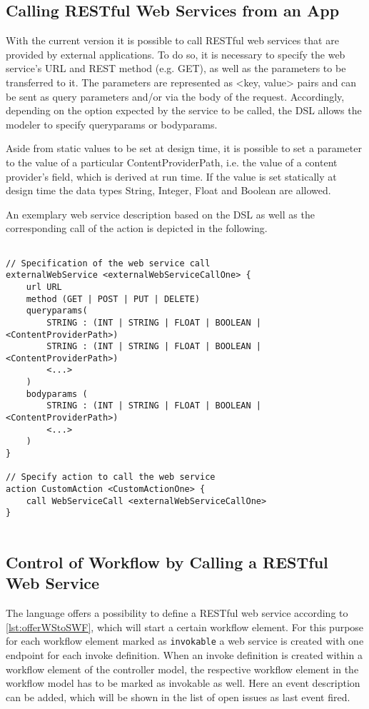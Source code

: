 
\subsection{Calling RESTful Web Services from an App}
\label{subsec: CallingWebServices}
With the current \MD version it is possible to call RESTful web services that are provided by external applications. To do so, it is necessary to specify the web service's URL and REST method (e.g. GET), as well as the parameters to be transferred to it. The parameters are represented as <key, value> pairs and can be sent as query parameters and/or via the body of the request. Accordingly, depending on the option expected by the service to be called, the DSL allows the modeler to specify queryparams or bodyparams. 

Aside from static values to be set at design time, it is possible to set a parameter to the value of a particular ContentProviderPath, i.e. the value of a content provider's field, which is derived at run time. If the value is set statically at design time the data types String, Integer, Float and Boolean are allowed. 

An exemplary web service description based on the DSL as well as the corresponding call of the action is depicted in the following.

\begin{lstlisting}[language=MD2, label=lst:callWSfromWF, caption=Calling a web service from within a workflow]

// Specification of the web service call
externalWebService <externalWebServiceCallOne> {
	url URL
	method (GET | POST | PUT | DELETE)
	queryparams(
		STRING : (INT | STRING | FLOAT | BOOLEAN | <ContentProviderPath>)	
		STRING : (INT | STRING | FLOAT | BOOLEAN | <ContentProviderPath>)
		<...>	
	)
	bodyparams (
		STRING : (INT | STRING | FLOAT | BOOLEAN | <ContentProviderPath>)
		<...>
	)
}

// Specify action to call the web service
action CustomAction <CustomActionOne> {
	call WebServiceCall <externalWebServiceCallOne>
}
	
\end{lstlisting}





\subsection{Control of Workflow by Calling a RESTful Web Service}
\label{subsec: WorkflowControlThroughWS}
The \MD language offers a possibility to define a RESTful web service according to \cref{lst:offerWStoSWF}, which will start a certain workflow element. For this purpose for each workflow element marked as \lstinline|invokable| a web service is created with one endpoint for each invoke definition. 
When an invoke definition is created within a workflow element of the controller model, the respective workflow element in the workflow model has to be marked as invokable as well. Here an event description can be added, which will be shown in the list of open issues as last event fired.

